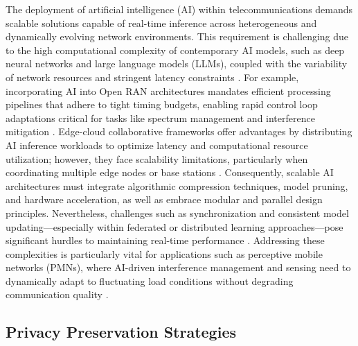 The deployment of artificial intelligence (AI) within telecommunications demands scalable solutions capable of real-time inference across heterogeneous and dynamically evolving network environments. This requirement is challenging due to the high computational complexity of contemporary AI models, such as deep neural networks and large language models (LLMs), coupled with the variability of network resources and stringent latency constraints \cite{ref7,ref49,ref52,ref53}. For example, incorporating AI into Open RAN architectures mandates efficient processing pipelines that adhere to tight timing budgets, enabling rapid control loop adaptations critical for tasks like spectrum management and interference mitigation \cite{ref48}. Edge-cloud collaborative frameworks offer advantages by distributing AI inference workloads to optimize latency and computational resource utilization; however, they face scalability limitations, particularly when coordinating multiple edge nodes or base stations \cite{ref49}. Consequently, scalable AI architectures must integrate algorithmic compression techniques, model pruning, and hardware acceleration, as well as embrace modular and parallel design principles. Nevertheless, challenges such as synchronization and consistent model updating—especially within federated or distributed learning approaches—pose significant hurdles to maintaining real-time performance \cite{ref52}. Addressing these complexities is particularly vital for applications such as perceptive mobile networks (PMNs), where AI-driven interference management and sensing need to dynamically adapt to fluctuating load conditions without degrading communication quality \cite{ref53}.

\subsection{Privacy Preservation Strategies}

